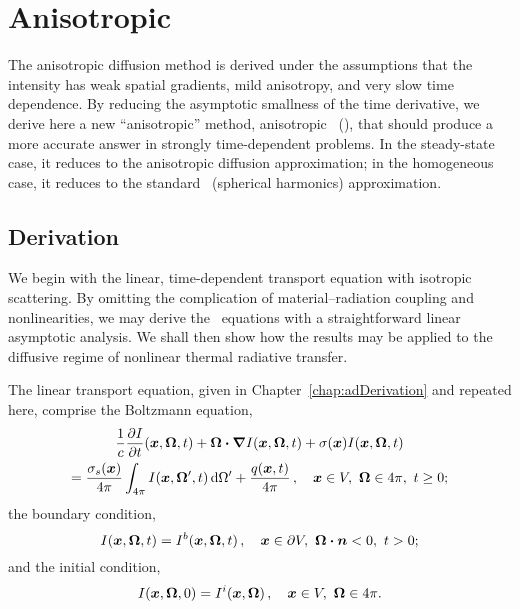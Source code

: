 
\chapter{Anisotropic \Pone}\label{chap:aponeDerivation}

The anisotropic diffusion method is derived under the assumptions that the
intensity has weak spatial gradients, mild anisotropy, and very slow time
dependence. By reducing the asymptotic smallness of the time derivative, we
derive here a new ``anisotropic'' method, anisotropic \Pone\ (\APone), that
should produce a more accurate answer in strongly time-dependent problems. In
the steady-state case, it reduces to the anisotropic diffusion approximation; in
the homogeneous case, it reduces to the standard \Pone\ (spherical harmonics)
approximation. 

\section{Derivation}

We begin with the linear, time-dependent transport equation with isotropic
scattering. By omitting the complication of material--radiation coupling and
nonlinearities, we may derive the \APone\ equations with a straightforward
linear asymptotic analysis. We shall then show how the results may be applied to
the diffusive regime of nonlinear thermal radiative transfer.

The linear transport equation, given in Chapter~\ref{chap:adDerivation}
and repeated here, comprise the Boltzmann equation,
\begin{multline} \tagref{eq:tdTransportVol}
  \frac{1}{c}\pder{I}{t}(\vec{x},\vec{\Omega},t)
  + \vec{\Omega}\vd \grad I(\vec{x},\vec{\Omega},t)
  + \sigma(\vec{x}) I(\vec{x},\vec{\Omega},t)
  \\ = \frac{\sigma_s(\vec{x})}{4\pi}
  \int_{4\pi} I(\vec{x},\vec{\Omega}',t) \ud \Omega'
  + \frac{q(\vec{x},t)}{4\pi}
  \,, \quad \vec{x}\in V,\ \vec{\Omega}\in4\pi,\ t \ge 0;
\end{multline}
the boundary condition,
\begin{equation} \tagref{eq:tdTransportBndy}
  I(\vec{x},\vec{\Omega},t) = I^b(\vec{x},\vec{\Omega},t) \,,
  \quad \vec{x}\in \partial V ,\ \vec{\Omega}\vd \vec{n} < 0,\ t > 0;
\end{equation}
and the initial condition,
\begin{equation} \tagref{eq:tdTransportInit}
  I(\vec{x},\vec{\Omega},0) = I^i(\vec{x},\vec{\Omega}) \,,
  \quad \vec{x}\in V ,\ \vec{\Omega} \in 4\pi.
\end{equation}

